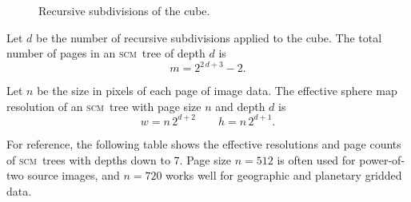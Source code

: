 \documentclass[oneside,11pt]{memoir}
\newcommand{\scm}     {\textsc{scm}}
\begin{document}
\begin{Spacing}{1.1}
\begin{figure}
  \centering
  \hfil
  \caption{Recursive subdivisions of the cube.}
  \label{fig:subdivision}
\end{figure}

Let $d$ be the number of recursive subdivisions applied to the cube. The total number of pages in an \scm\ tree of depth $d$ is
\[m=2^{2\,d+3}-2.\]

Let $n$ be the size in pixels of each page of image data. The effective sphere map resolution of an \scm\ tree with page size $n$ and depth $d$ is
\[w=n\,2^{d+2}\qquad h=n\,2^{d+1}.\]

For reference, the following table shows the effective resolutions and page counts of \scm\ trees with depths down to $7$. Page size $n=512$ is often used for power-of-two source images, and $n=720$ works well for geographic and planetary gridded data.


\end{Spacing}
\end{document}

